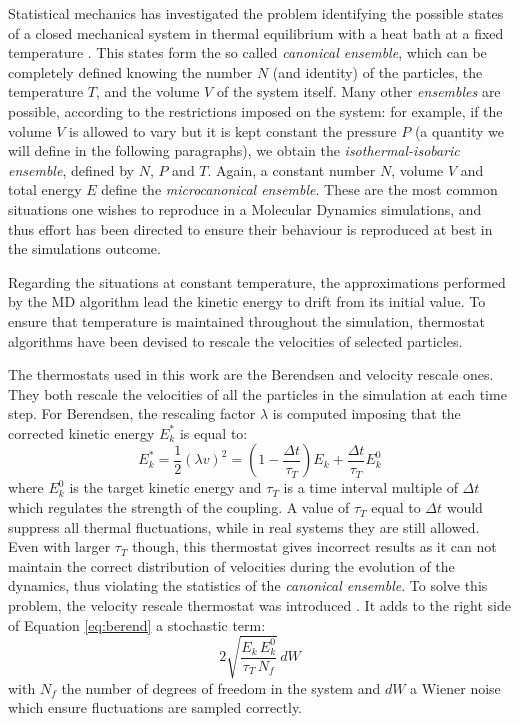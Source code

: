 Statistical mechanics has investigated the problem identifying the possible states of a closed mechanical system in thermal equilibrium with a heat bath at a fixed temperature \citep{gibbs_2010}. This states form the so called \emph{canonical ensemble}, which can be completely defined knowing the number $N$ (and identity) of the particles, the temperature $T$, and the volume $V$ of the system itself.
%
Many other \emph{ensembles} are possible, according to the restrictions imposed on the system: for example, if the volume $V$ is allowed to vary but it is kept constant the pressure $P$ (a quantity we will define in the following paragraphs), we obtain the \emph{isothermal-isobaric ensemble}, defined by $N$, $P$ and $T$.
%
Again, a constant number $N$, volume $V$ and total energy $E$ define the \emph{microcanonical ensemble}.
%
These are the most common situations one wishes to reproduce in a Molecular Dynamics simulations, and thus effort has been directed to ensure their behaviour is reproduced at best in the simulations outcome. 
 

Regarding the situations at constant temperature, the approximations performed by the MD algorithm lead the kinetic energy to drift from its initial value. To ensure that temperature is maintained throughout the simulation, thermostat algorithms have been devised to rescale the velocities of selected particles.

The thermostats used in this work are the Berendsen \citep{Berendsen1984} and velocity rescale \citep{Bussi2007} ones.
They both rescale the velocities of all the particles in the simulation at each time step. For Berendsen, the rescaling factor $\lambda$ is computed imposing that the corrected kinetic energy $E^*_k$ is equal to:
\begin{equation} \label{eq:berend}
    E^*_k = \frac{1}{2} \left(\lambda v\right)^2  = \left( 1 - \frac{\Delta t}{\tau_T} \right) E_k + \frac{\Delta t}{\tau_T} E_k^0
\end{equation}
where $E_k^0$ is the target kinetic energy and $\tau_T$ is a time interval multiple of $\Delta t$ which regulates the strength of the coupling. A value of $\tau_T$ equal to $\Delta t$ would suppress all thermal fluctuations, while in real systems they are still allowed.
%
Even with larger $\tau_T$ though, this thermostat gives incorrect results as it can not maintain the correct distribution of velocities during the evolution of the dynamics, thus violating the statistics of the \emph{canonical ensemble}. To solve this problem, the velocity rescale thermostat was introduced \citep{Bussi2007}. It adds to the right side of Equation \ref{eq:berend} a stochastic term:
\begin{equation}
    2 \sqrt{\frac{E_k\,E_k^0}{\tau_T\,N_f}}\, dW
\end{equation}
with $N_f$ the number of degrees of freedom in the system and $dW$ a Wiener noise \citep{Durrett2010} which ensure fluctuations are sampled correctly.

